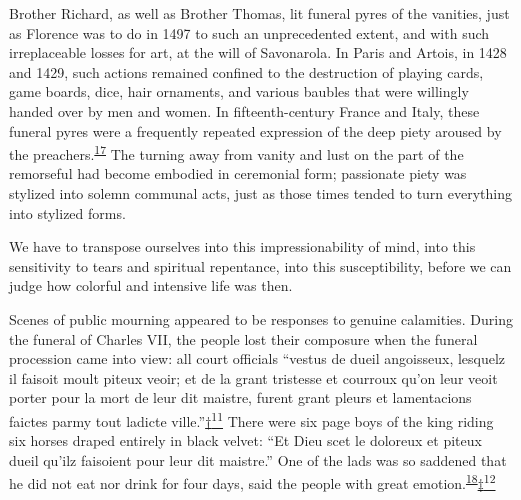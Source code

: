 Brother Richard, as well as Brother Thomas, lit funeral pyres of the
vanities, just as Florence was to do in 1497 to such an unprecedented
extent, and with such irreplaceable losses for art, at the will of
Savonarola. In Paris and Artois, in 1428 and 1429, such actions remained
confined to the destruction of playing cards, game boards, dice, hair
ornaments, and various baubles that were willingly handed over by men
and women. In fifteenth-century France and Italy, these funeral pyres
were a frequently repeated expression of the deep piety aroused by the
preachers.\textsuperscript{\protect\hypertarget{08_Chapter_One__THE_PASSIONATE_INTE.xhtmlux5cux23id_2196}{\protect\hyperlink{23_NOTES.xhtmlux5cux23id_2197}{17}}}
The turning away from vanity and lust on the part of the remorseful had
become embodied in ceremonial form; passionate piety was stylized into
solemn communal acts, just as those times tended to turn everything into
stylized forms.

We have to transpose ourselves into this impressionability of mind, into
this sensitivity to tears and spiritual repentance, into this
susceptibility, before we can judge how colorful and intensive life was
then.

Scenes of public mourning appeared to be responses to genuine
calamities. During the funeral of Charles VII, the people lost their
composure when the funeral procession came into view: all court
officials ``vestus de dueil angoisseux, lesquelz il faisoit moult piteux
veoir; et de la grant tristesse et courroux qu'on leur veoit porter pour
la mort de leur dit maistre, furent grant pleurs et lamentacions faictes
parmy tout ladicte
ville.''\protect\hypertarget{08_Chapter_One__THE_PASSIONATE_INTE.xhtmlux5cux23id_2269}{\protect\hyperlink{23_NOTES.xhtmlux5cux23id_2268}{†\textsuperscript{11}}}
There were six page boys of the king riding six horses draped entirely
in black velvet: ``Et Dieu scet le doloreux et piteux dueil qu'ilz
faisoient pour leur dit maistre.'' One of the lads was so saddened that
he did not eat nor drink for four days, said the people with great
emotion.\textsuperscript{\protect\hypertarget{08_Chapter_One__THE_PASSIONATE_INTE.xhtmlux5cux23id_2194}{\protect\hyperlink{23_NOTES.xhtmlux5cux23id_2195}{18}}}\protect\hypertarget{08_Chapter_One__THE_PASSIONATE_INTE.xhtmlux5cux23id_2271}{\protect\hyperlink{23_NOTES.xhtmlux5cux23id_2274}{‡\textsuperscript{12}}}

